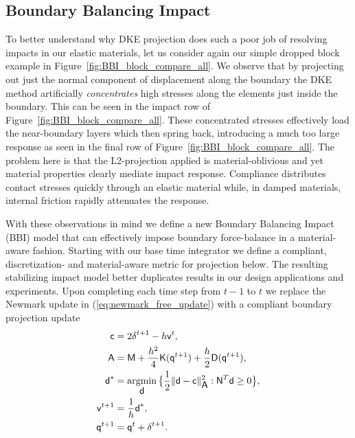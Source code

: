 \subsection{Boundary Balancing Impact}
To better understand why DKE projection does such a poor job of resolving impacts in our elastic materials, let us consider again our simple dropped block example in Figure~\ref{fig:BBI_block_compare_all}.
We observe that by projecting out just the normal component of displacement along the boundary the DKE method artificially \emph{concentrates} high stresses along the elements just inside the boundary. This can be seen in the impact row of Figure~\ref{fig:BBI_block_compare_all}.
These concentrated stresses effectively load the near-boundary layers which then spring back, introducing a much too large response as seen in the final row of Figure~\ref{fig:BBI_block_compare_all}.
The problem here is that the L2-projection applied is material-oblivious and yet material properties clearly mediate impact response. Compliance distributes contact stresses quickly through an elastic material while, in damped materials, internal friction rapidly attenuates the response. 

With these observations in mind we define a new Boundary Balancing Impact (BBI) model that can effectively impose boundary force-balance in a material-aware fashion. Starting with our base time integrator we define a compliant, discretization- and material-aware metric for projection below. The resulting stabilizing impact model better duplicates results in our design applications and experiments. Upon completing each time step from $t-1$ to $t$ we replace the Newmark update in (\ref{eq:newmark_free_update}) with a compliant boundary projection update
\begin{align}
\begin{split}
\mbox{\textbf{{$\mathsf c$}}} &= 2 \mbox{\textbf{{$\mathsf \delta$}}}^{t+1} - h \mbox{\textbf{{$\mathsf v$}}}^t, \\
\mbox{\textbf{{$\mathsf A$}}} &= \mbox{\textbf{{$\mathsf M$}}} + \frac{h^2}{4} \mbox{\textbf{{$\mathsf K$}}}(\mbox{\textbf{{$\mathsf q$}}}^{t+1}) + \frac{h}{2} \mbox{\textbf{{$\mathsf D$}}}(\mbox{\textbf{{$\mathsf q$}}}^{t+1}) ,\\
\mbox{\textbf{{$\mathsf d$}}}^* &= \mathop{\rm argmin}_{\mbox{\textbf{{$\mathsf d$}}}} \big\{ \frac{1}{2} \| \mbox{\textbf{{$\mathsf d$}}} - \mbox{\textbf{{$\mathsf c$}}} \|^2_{\mbox{\textbf{{$\mathsf A$}}}} : \mbox{\textbf{{$\mathsf N$}}}^T \mbox{\textbf{{$\mathsf d$}}} \geq 0 \big\},\\
\mbox{\textbf{{$\mathsf v$}}}^{t+1} &= \frac{1}{h} \mbox{\textbf{{$\mathsf d$}}}^*,\\
\mbox{\textbf{{$\mathsf q$}}}^{t+1} &= \mbox{\textbf{{$\mathsf q$}}}^t + \mbox{\textbf{{$\mathsf \delta$}}}^{t+1}.\\
\end{split}
\label{eq:newmark_predictor_proj}
\end{align}

